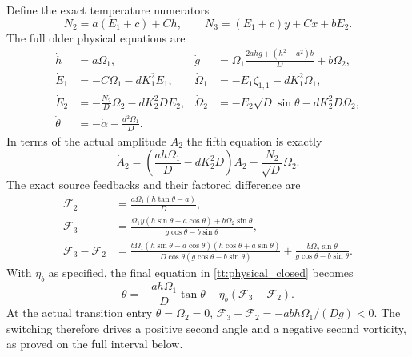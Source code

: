 Define the exact temperature numerators
\begin{equation}\label{tt:numerators}
 N_2=a(E_1+c)+Ch,\qquad
 N_3=(E_1+c)y+Cx+bE_2.
\end{equation}
The full older physical equations are
\begin{align}\label{tt:physical_closed}
 \dot h&=a\Omega_1,&
 \dot g&=\Omega_1\frac{2ahg+(h^2-a^2)b}{D}+b\Omega_2,\\
 \dot E_1&=-C\Omega_1-dK_1^2E_1,&
 \dot\Omega_1&=-E_1\zeta_{1,1}-dK_1^2\Omega_1,\nonumber\\
 \dot E_2&=-\frac{N_2}{D}\Omega_2-dK_2^2DE_2,&
 \dot\Omega_2&=-E_2\sqrt D\sin\theta-dK_2^2D\Omega_2,\nonumber\\
 \dot\theta&=-\dot\alpha-\frac{a^2\Omega_1}{D}.&&\nonumber
\end{align}
In terms of the actual amplitude $A_2$ the fifth equation is exactly
\[
 \dot A_2=\left(\frac{ah\Omega_1}{D}-dK_2^2D\right)A_2
               -\frac{N_2}{\sqrt D}\Omega_2.
\]
The exact source feedbacks and their factored difference are
\begin{align}\label{tt:feedback}
 \mathcal F_2&=\frac{a\Omega_1(h\tan\theta-a)}{D},\\
 \mathcal F_3&=
 \frac{\Omega_1y(h\sin\theta-a\cos\theta)+b\Omega_2\sin\theta}
      {g\cos\theta-b\sin\theta},\nonumber\\
 \mathcal F_3-\mathcal F_2
 &=\frac{b\Omega_1(h\sin\theta-a\cos\theta)
                  (h\cos\theta+a\sin\theta)}
         {D\cos\theta(g\cos\theta-b\sin\theta)}
     +\frac{b\Omega_2\sin\theta}{g\cos\theta-b\sin\theta}.\nonumber
\end{align}
With $\eta_b$ as specified, the final equation in
\eqref{tt:physical_closed} becomes
\begin{equation}\label{tt:angle}
 \dot\theta=-\frac{ah\Omega_1}{D}\tan\theta
                  -\eta_b(\mathcal F_3-\mathcal F_2).
\end{equation}
At the actual transition entry $\theta=\Omega_2=0$,
$\mathcal F_3-\mathcal F_2=-abh\Omega_1/(Dg)<0$.
The switching therefore drives a positive second angle and a negative
second vorticity, as proved on the full interval below.

